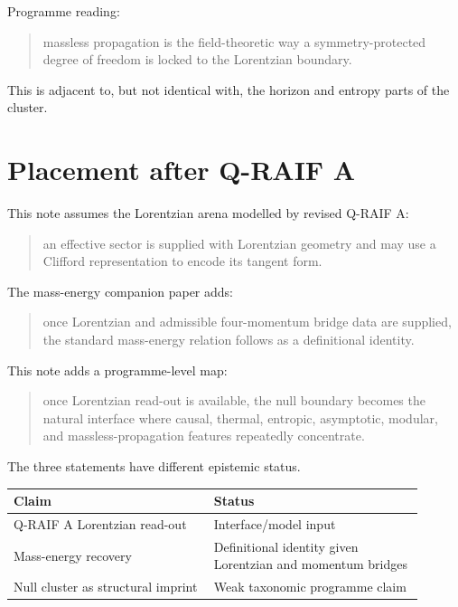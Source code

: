 \documentclass[12pt,a4paper]{article}
\theoremstyle{definition}
\theoremstyle{remark}
\begin{document}
Programme reading:

\begin{quote}
massless propagation is the field-theoretic way a symmetry-protected
degree of freedom is locked to the Lorentzian boundary.
\end{quote}

This is adjacent to, but not identical with, the horizon and entropy
parts of the cluster.

\section{Placement after Q-RAIF A}\label{placement-after-q-raif-a}

This note assumes the Lorentzian arena modelled by revised Q-RAIF A:

\begin{quote}
an effective sector is supplied with Lorentzian geometry and may use a
Clifford representation to encode its tangent form.
\end{quote}

The mass-energy companion paper adds:

\begin{quote}
once Lorentzian and admissible four-momentum bridge data are supplied,
the standard mass-energy relation follows as a definitional identity.
\end{quote}

This note adds a programme-level map:

\begin{quote}
once Lorentzian read-out is available, the null boundary becomes the
natural interface where causal, thermal, entropic, asymptotic, modular,
and massless-propagation features repeatedly concentrate.
\end{quote}

The three statements have different epistemic status.

\begin{center}
\begin{tabular}{P{0.44\linewidth}P{0.46\linewidth}}
\toprule
\textbf{Claim} & \textbf{Status} \\
\midrule
Q-RAIF A Lorentzian read-out & Interface/model input \\
Mass-energy recovery & Definitional identity given Lorentzian and momentum bridges \\
Null cluster as structural imprint & Weak taxonomic programme claim \\
\bottomrule
\end{tabular}
\end{center}
\end{document}
